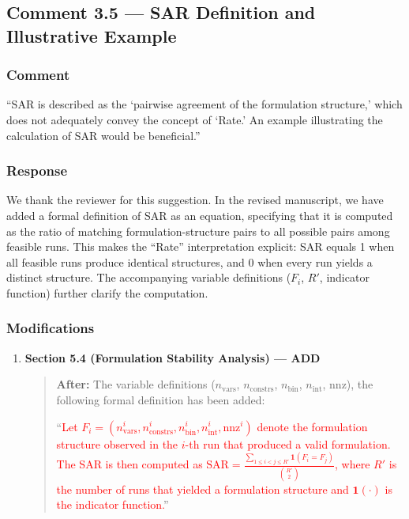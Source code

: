 \documentclass[11pt,a4paper]{article}
\begin{document}
\subsection{Comment 3.5 --- SAR Definition and Illustrative Example}

\subsubsection{Comment}
``SAR is described as the `pairwise agreement of the formulation structure,' which does not adequately convey the concept of `Rate.' An example illustrating the calculation of SAR would be beneficial.''

\subsubsection{Response}
We thank the reviewer for this suggestion. In the revised manuscript, we have added a formal definition of SAR as an equation, specifying that it is computed as the ratio of matching formulation-structure pairs to all possible pairs among feasible runs. This makes the ``Rate'' interpretation explicit: SAR equals 1 when all feasible runs produce identical structures, and 0 when every run yields a distinct structure. The accompanying variable definitions ($F_i$, $R'$, indicator function) further clarify the computation.

\subsubsection{Modifications}
\begin{enumerate}
\item \textbf{Section 5.4 (Formulation Stability Analysis) --- ADD}
\begin{quote}
\textbf{After:} The variable definitions ($n_{\text{vars}}$, $n_{\text{constrs}}$, $n_{\text{bin}}$, $n_{\text{int}}$, nnz), the following formal definition has been added:

``\textcolor{red}{Let $F_i=(n_{\text{vars}}^i, n_{\text{constrs}}^i, n_{\text{bin}}^i, n_{\text{int}}^i, \text{nnz}^i)$ denote the formulation structure observed in the $i$-th run that produced a valid formulation. The SAR is then computed as $\text{SAR}=\frac{\sum_{1\le i<j\le R'}\mathbf{1}(F_i=F_j)}{\binom{R'}{2}}$, where $R'$ is the number of runs that yielded a formulation structure and $\mathbf{1}(\cdot)$ is the indicator function.}''
\end{quote}
\end{enumerate}
\end{document}
